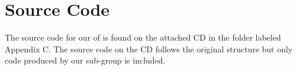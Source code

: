 
\chapter{Source Code}
The source code for our \subsystem{} of \system{} is found on the attached CD in the folder labeled Appendix C. 
The source code on the CD follows the original structure but only code produced by our sub-group is included. 